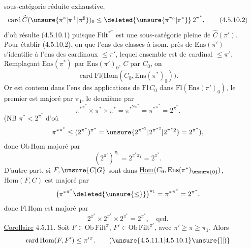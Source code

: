 sous-catégorie réduite exhaustive,
\[
\operatorname{card}\widehat C(\unsure{\pi^*|\pi^+|\pi^\sharp})_0
\leq\deleted{\unsure{\pi^{\pi_0}|\pi^*}}\,2^{\pi^*},
\tag*{(4.5.10.2)}
\]
 d'où résulte (4.5.10.1) puisque  $\mathrm{Filt}^{\pi^*}$ est une sous-catégorie pleine de $\widehat C(\pi')$. Pour établir (4.5.10.2), on  que l'ens des classes à isom. près de $\mathrm{Ens}(\pi')$ s'identifie à l'ens des cardinaux $\leq\pi'$, lequel ensemble est de cardinal $\leq\pi'$. Remplaçant $\mathrm{Ens}(\pi^*)$ par $\mathrm{Ens}(\pi')_0$, $C$ par $C_0$, on  
\[
\operatorname{card}\mathrm{Fl}\bigl(\underline{\mathrm{Hom}}(C_0,\mathrm{Ens}(\pi^*)_0)\bigr).
\]
Or   est contenu dans l'ens des applications de $\mathrm{Fl}\,C_0$ dans $\mathrm{Fl}(\mathrm{Ens}(\pi')_0)$, le premier est majoré par $\pi_1$, le deuxième par
\[
{\pi^*}^{\pi^*}\times\pi^*\times\pi^*
={\pi^*}^{2\pi^*}={\pi^*}^{\pi^*}=2^{\pi^*}.
\]
(NB $\pi^*<2^{\pi^*}$ d'où
\[
{\pi^*}^{\pi^*}\leq(2^{\pi^*})^{\pi^*}
=\unsure{2^{\pi^{*2}}|2^{{\pi^*}^2}|2^{\pi^*2}}=2^{\pi^*}),
\]
donc $\mathrm{Ob}\,\underline{\mathrm{Hom}}$ majoré par
\[
(2^{\pi'})^{\pi_1}=2^{\pi^*\pi_1}=2^{\pi^*}.
\]
D'autre part, si $F,\unsure{C|G}$ sont dans $\underline{\mathrm{Hom}}(C_0,\mathrm{Ens}(\pi^*)_{\unsure{0}})$, $\mathrm{Hom}(F,C)$ est majoré par
\[
\bigl({\pi^*}^{\pi^*}\deleted{\unsure{\leq}}\bigr)^{\pi_1}
={\pi^*}^{\pi^*}=2^{\pi^*}.
\]
donc $\mathrm{Fl}\,\underline{\mathrm{Hom}}$ est majoré par
\[
2^{\pi^*}\times2^{\pi^*}\times2^{\pi^*}=2^{\pi^*},\quad\text{qed.}
\]
\uline{Corollaire} 4.5.11. Soit $F\in\mathrm{Ob}\,\mathrm{Filt}^{\pi}$, $F'\in\mathrm{Ob}\,\mathrm{Filt}^{\pi'}$, avec $\pi'\geq\pi\geq\pi_1$. Alors
\[
\operatorname{card}\mathrm{Hom}(F,F')\leq\pi'{}^\pi.
\tag*{(\unsure{4.5.11.1|4.5.10.1}\unsure{]|)}}
\]

